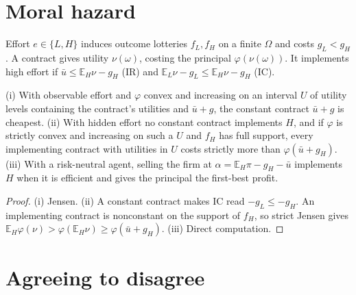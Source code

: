 \section{Moral hazard}
\label{sec:moral-hazard}

\begin{definition}
\label{def:moral-hazard}
\leanok
Effort $e\in\{L,H\}$ induces outcome lotteries $f_L, f_H$ on a finite $\Omega$ and costs $g_L < g_H$.
A contract gives utility $\nu(\omega)$, costing the principal $\varphi(\nu(\omega))$. It implements high effort
if $\bar u \le \mathbb{E}_H\nu - g_H$ (IR) and $\mathbb{E}_L\nu - g_L \le \mathbb{E}_H\nu - g_H$ (IC).
\end{definition}

\begin{theorem}
\label{thm:moral-hazard}
\leanok
{}
(i) With observable effort and $\varphi$ convex and increasing on an interval $U$ of utility levels containing the
contract's utilities and $\bar u + g$, the constant contract $\bar u + g$ is cheapest.
(ii) With hidden effort no constant contract implements $H$, and if $\varphi$ is strictly convex and increasing on such
a $U$ and $f_H$ has full support, every implementing contract with utilities in $U$ costs strictly more than
$\varphi(\bar u + g_H)$.
(iii) With a risk-neutral agent, selling the firm at $\alpha = \mathbb{E}_H\pi - g_H - \bar u$ implements $H$ when it is
efficient and gives the principal the first-best profit.
\end{theorem}
\begin{proof}
\leanok
(i) Jensen. (ii) A constant contract makes IC read $-g_L \le -g_H$. An implementing contract is nonconstant
on the support of $f_H$, so strict Jensen gives $\mathbb{E}_H\varphi(\nu) > \varphi(\mathbb{E}_H\nu) \ge \varphi(\bar u + g_H)$.
(iii) Direct computation.
\end{proof}

\section{Agreeing to disagree}
\label{sec:aumann}

